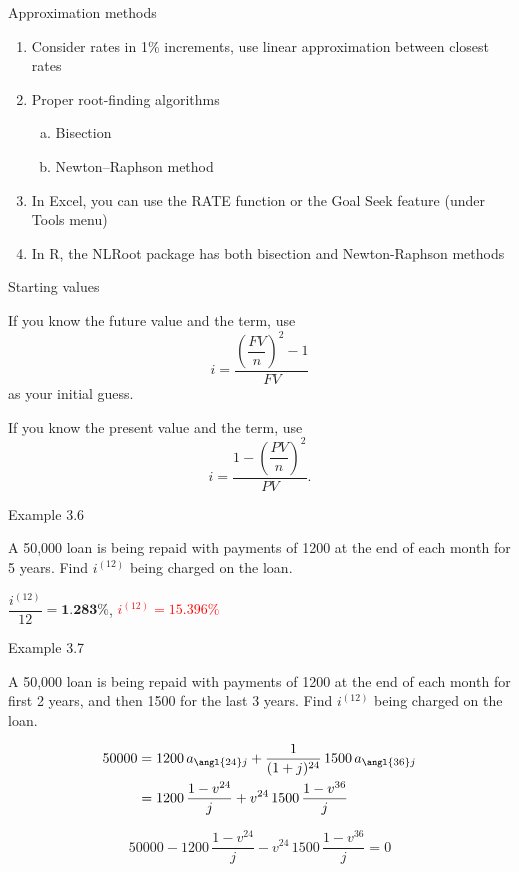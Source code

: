 \documentclass{beamer}
\begin{document}
\begin{frame}{Approximation methods}

\begin{enumerate}
\item Consider rates in 1\% increments, use linear approximation between closest rates
\item Proper root-finding algorithms
  \begin{enumerate}[a.]
  \item Bisection
  \item Newton--Raphson method
  \end{enumerate}
\item In Excel, you can use the RATE function or the Goal Seek feature (under Tools menu)
\item In R, the NLRoot package has both bisection and Newton-Raphson methods
\end{enumerate}

\end{frame}

\begin{frame}{Starting values}

If you know the future value and the term, use
\[
i = \frac{\left(\dfrac{FV}{n}\right)^2 - 1}{FV}
\]
as your initial guess.

\medskip
If you know the present value and the term, use
\[
i = \frac{1 - \left(\dfrac{PV}{n}\right)^2}{PV}.
\]

\end{frame}

\begin{frame}{Example 3.6}

A 50,000 loan is being repaid with payments of 1200 at the end of each month for 5 years. Find $i^{(12)}$ being charged on the loan.

\vspace{3em}
$\dfrac{i^{(12)}}{12} = \textbf{1.283\%}$, \quad \textcolor{red}{$i^{(12)} = 15.396\%$}

\vfill
\end{frame}

\begin{frame}{Example 3.7}

A 50,000 loan is being repaid with payments of 1200 at the end of each month for first 2 years, and then 1500 for the last 3 years. Find $i^{(12)}$ being charged on the loan.

\begin{align*}
50000 &= 1200\,a_{\angl{24}j} + \frac{1}{(1+j)^{24}}\,1500\,a_{\angl{36}j} \\
&= 1200\,\frac{1-v^{24}}{j} + v^{24}\,1500\,\frac{1-v^{36}}{j}
\end{align*}

\[
50000 - 1200\,\frac{1-v^{24}}{j} - v^{24}\,1500\,\frac{1-v^{36}}{j} = 0
\]

\end{frame}
\end{document}
